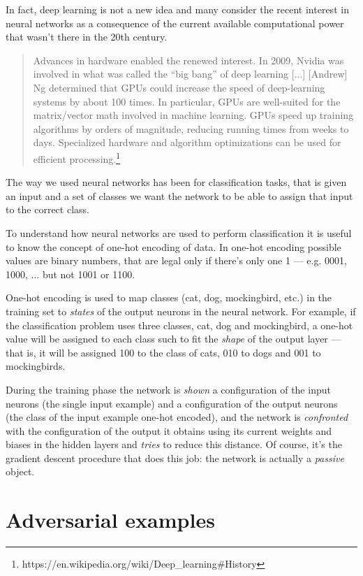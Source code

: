 In fact, deep learning is not a new idea and many consider the recent
interest in neural networks as a consequence of the current available
computational power that wasn't there in the 20th century.

\begin{quote}
  Advances in hardware enabled the renewed interest. In 2009, Nvidia
  was involved in what was called the ``big bang'' of deep learning
  [...] [Andrew] Ng determined that GPUs could increase the speed of
  deep-learning systems by about 100 times. In particular, GPUs are
  well-suited for the matrix/vector math involved in machine learning.
  GPUs speed up training algorithms by orders of magnitude, reducing
  running times from weeks to days. Specialized hardware and algorithm
  optimizations can be used for efficient
  processing.\footnote{https://en.wikipedia.org/wiki/Deep\_learning\#History}
\end{quote}

The way we used neural networks has been for classification tasks, that
is given an input and a set of classes we want the network to be able
to assign that input to the correct class.

To understand how neural networks are used to perform classification it
is useful to know the concept of one-hot encoding of data. In one-hot
encoding possible values are binary numbers, that are legal only if
there's only one 1 --- e.g. 0001, 1000, ... but not 1001 or 1100.

One-hot encoding is used to map classes (cat, dog, mockingbird, etc.)
in the training set to \emph{states} of the output neurons in the
neural network. For example, if the classification problem uses three
classes, cat, dog and mockingbird, a one-hot value will be assigned to
each class such to fit the \emph{shape} of the output layer --- that
is, it will be assigned 100 to the class of cats, 010 to dogs and 001
to mockingbirds.

During the training phase the network is \emph{shown} a
configuration of the input neurons (the single input example) and a
configuration of the output neurons (the class of the input example
one-hot encoded), and the network is \emph{confronted} with the
configuration of the output it obtains using its current weights and biases
in the hidden layers and \emph{tries} to reduce this distance. Of
course, it's the gradient descent procedure that does this job: the
network is actually a \emph{passive} object.

\section{Adversarial examples}
\label{sec:adversarial-examples}

